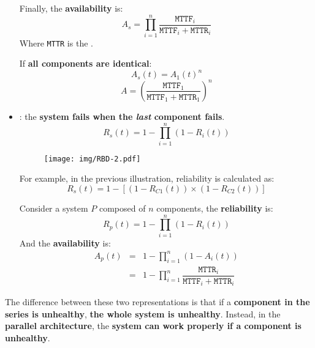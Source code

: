 \begin{itemize}
    Finally, the \textbf{availability} is:
    \begin{equation}
        A_{s} = \prod_{i=1}^{n} \dfrac{\texttt{MTTF}_{i}}{\texttt{MTTF}_{i} + \texttt{MTTR}_{i}}
    \end{equation}
    Where \texttt{MTTR} is the .

    If \textbf{all components are identical}:
    \begin{equation}
        A_{s}\left(t\right) = A_{1}\left(t\right)^{n}
    \end{equation}
    \begin{equation}
        A = \left(\dfrac{
            \texttt{MTTF}_{1}
        }{
            \texttt{MTTF}_{1} + \texttt{MTTR}_{1}
        }\right)^{n}
    \end{equation}


    \item {}: the \textbf{system fails when the \emph{last} component fails}.
    \begin{equation}
        R_{s}\left(t\right) = 1 - \prod_{i=1}^{n} \left(1 - R_{i}\left(t\right)\right)
    \end{equation}
    \begin{figure}[!htp]
        \centering
        \texttt{[image: img/RBD-2.pdf]}
    \end{figure}

    For example, in the previous illustration, reliability is calculated as:
    \begin{equation*}
        R_{s}\left(t\right) = 1 - \left[\left(1-R_{C1}\left(t\right)\right) \times \left(1-R_{C2}\left(t\right)\right)\right]
    \end{equation*}

    Consider a system $P$ composed of $n$ components, the \textbf{reliability} is:
    \begin{equation}
        R_{p}\left(t\right) = 1 - \prod_{i=1}^{n} \left(1 - R_{i}\left(t\right)\right)
    \end{equation}
    And the \textbf{availability} is:
    \begin{equation}
        \begin{array}{rcl}
            A_{p}\left(t\right) &=& 1 - \displaystyle\prod_{i=1}^{n} \left(1 - A_{i}\left(t\right)\right) \\ [1em]
            &=& 1 - \displaystyle\prod_{i=1}^{n} \dfrac{\texttt{MTTR}_{i}}{\texttt{MTTF}_{i} + \texttt{MTTR}_{i}}
        \end{array}
    \end{equation}
\end{itemize}
The difference between these two representations is that if a \textbf{component in the series is unhealthy}, \textbf{the whole system is unhealthy}. Instead, in the \textbf{parallel architecture}, the \textbf{system can work properly if a component is unhealthy}.

